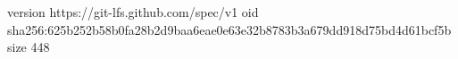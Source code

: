 version https://git-lfs.github.com/spec/v1
oid sha256:625b252b58b0fa28b2d9baa6eae0e63e32b8783b3a679dd918d75bd4d61bcf5b
size 448
